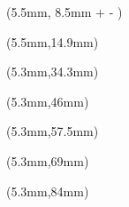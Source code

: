 \documentclass[final]{article}
\begin{document}
\raggedright
\color{white}


\newlength{\originalhight}
\newlength{\originallength}
\newlength{\perfecthight}
\setlength{\perfecthight}{10pt}
\newlength{\maxlength}
\setlength{\maxlength}{40mm}
\settoheight{\originalhight}{\noindent \fontsize{10}{10} \selectfont{\MakeUppercase{\playername}}
		\ifdim \originallength > \maxlength
		\resizebox{\maxlength}{!}{\noindent \fontsize{10}{10} \selectfont{\MakeUppercase{\playername}}}
		\else
		\noindent \fontsize{10}{10} \selectfont{\MakeUppercase{\playername}}
		\fi}

\begin{textblock*}{40mm}(5.5mm, 8.5mm + \perfecthight - \originalhight)
	\settowidth{\originallength}{\noindent \fontsize{10}{10} \selectfont\textbf{\color{namecolor}\MakeUppercase{\playername}}}
	\ifdim \originallength > \maxlength
		\resizebox{\maxlength}{!}{\noindent \fontsize{10}{10} \selectfont\textbf{\color{namecolor}\MakeUppercase{\playername}}}
	\else
		\noindent \fontsize{10}{10} \selectfont\textbf{\color{namecolor}\MakeUppercase{\playername}}
	\fi
\end{textblock*}


\begin{textblock*}{30mm}(5.5mm,14.9mm)
	\noindent \fontsize{8}{8} \selectfont \textcolor{positioncolor}{\position}
\end{textblock*}

\begin{textblock*}{13mm}(5.3mm,34.3mm)
	\noindent \fontsize{11}{11} \trebuchet {\cata}
\end{textblock*}
\begin{textblock*}{11mm}(5.3mm,46mm)
	\noindent \fontsize{11}{11} \trebuchet {\catb}
\end{textblock*}
\begin{textblock*}{10mm}(5.3mm,57.5mm)
	\noindent \fontsize{11}{11} \trebuchet {\catc}
\end{textblock*}
\begin{textblock*}{11mm}(5.3mm,69mm)
	\noindent \fontsize{11}{11} \trebuchet {\catd}
\end{textblock*}

\begin{textblock*}{12mm}(5.3mm,84mm)
	\noindent \fontsize{18}{18} \trebuchet {\#\playernumber}
\end{textblock*}
\end{document}
